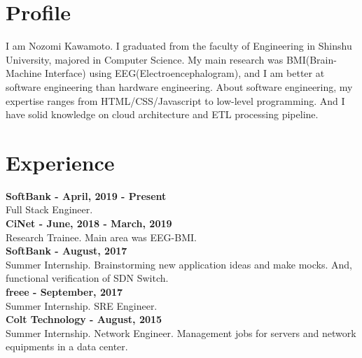 \documentclass[11pt]{article} %
\begin{document}
\begin{paracol}{2}
\switchcolumn %

\section{Profile}
I am Nozomi Kawamoto. I graduated from the faculty of Engineering in Shinshu University, majored in Computer Science. 
My main research was BMI(Brain-Machine Interface) using EEG(Electroencephalogram), and I am better at software engineering than hardware engineering.
About software engineering, my expertise ranges from HTML/CSS/Javascript to low-level programming. And I have solid knowledge on cloud architecture and ETL processing pipeline. 

\vspace{1cm}

\section{Experience}
\textbf{\color{subtitle}SoftBank - April, 2019 - Present}\\
Full Stack Engineer.\\

\textbf{\color{subtitle}CiNet - June, 2018 - March, 2019}\\
Research Trainee. Main area was EEG-BMI.\\

\textbf{\color{subtitle}SoftBank - August, 2017}\\
Summer Internship. Brainstorming new application ideas and make mocks. And, functional verification of SDN Switch.\\

\textbf{\color{subtitle}freee - September, 2017}\\
Summer Internship. SRE Engineer.\\

\textbf{\color{subtitle}Colt Technology - August, 2015}\\
Summer Internship. Network Engineer. Management jobs for servers and network equipments in a data center.\\

\vspace{1cm}


\end{paracol}
\end{document}
